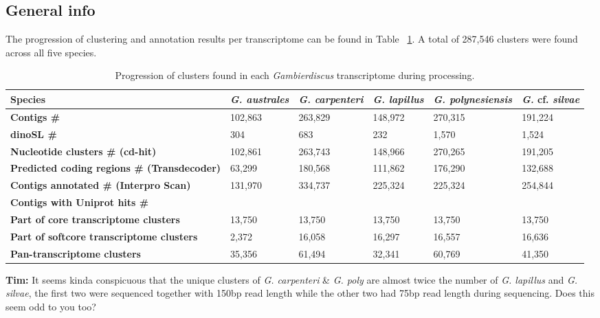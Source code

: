 \documentclass[12pt]{article}
\begin{document}
\subsection*{General info}
The progression of clustering and annotation results per transcriptome can be found in Table ~\ref{tbl:ClustTable}. 
A total of 287,546 clusters were found across all five species. \\

\begin{table}
\caption{Progression of clusters found in each \emph{Gambierdiscus} transcriptome during processing.}
\label{tbl:ClustTable}
\begin{tabular}{ | p{3cm} | p{2cm} | p{2.5cm} | p{2.5cm} | p{2cm} | p{2cm}|}
\hline
\textbf{Species}& \textit{G. australes}& \emph{G. carpenteri}&\emph{G. lapillus}&\emph{G. polynesiensis}&\emph{G.} cf. \emph{silvae}\\
\hline
\textbf{Contigs \#}&102,863&263,829&148,972&270,315&191,224\\
\hline
\textbf{dinoSL \#}&304&683&232&1,570&1,524\\
\hline
\textbf{Nucleotide clusters \# (cd-hit)}&102,861&263,743&148,966&270,265&191,205\\
\hline
\textbf{Predicted coding regions \# (Transdecoder)}&63,299&180,568&111,862&176,290&132,688\\
\hline
\textbf{Contigs annotated \# (Interpro Scan)}&131,970&334,737&225,324&225,324&254,844\\ 
\hline
\textbf{Contigs with Uniprot hits \#}&&&&&\\ 
\hline
\textbf{Part of core transcriptome clusters}&13,750&13,750&13,750&13,750&13,750\\
\hline
\textbf{Part of softcore transcriptome clusters}&2,372&16,058&16,297&16,557&16,636\\
\hline
\textbf{Pan-transcriptome clusters}&35,356&61,494&32,341&60,769&41,350\\
\hline
\end{tabular}
\end{table}
\FloatBarrier
\newpage
\textbf{Tim:} It seems kinda conspicuous that the unique clusters of \textit{G. carpenteri} \& \textit{G. poly} are almost twice the number of \textit{G. lapillus} and \textit{G. silvae}, the first two were sequenced together with 150bp read length while the other two had 75bp read length during sequencing. Does this seem odd to you too?
\end{document}
